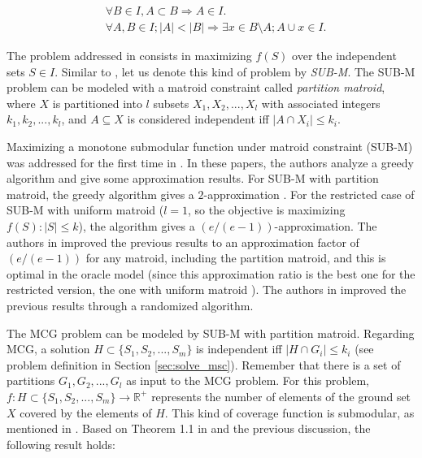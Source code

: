 \begin{align*}
&\tag{i} \forall B \in I, A \subset B \Rightarrow A \in I.\\ 
&\tag{ii} \forall A,B \in I; |A| < |B| \Rightarrow \exists x \in B \setminus A; A \cup x \in I.
\end{align*}

The problem addressed in \cite{Calinescu2011} consists in maximizing $f(S)$ over the independent sets $S \in I$. Similar to \cite{Calinescu2011}, 
let us denote this kind of problem by \emph{SUB-M}. The SUB-M problem can be modeled with a matroid constraint 
called \emph{partition matroid}, where $X$ is partitioned 
into $l$ subsets $X_1, X_2, ..., X_l$ with associated integers $k_1, k_2, ..., k_l$, 
and $A \subseteq X$ is considered independent iff $|A \cap X_i| \leq k_i$. 

Maximizing a monotone submodular function under matroid constraint (SUB-M) was addressed for the first time in \cite{Nemhauser1978,Fisher1978}. 
In these papers, the authors analyze a greedy algorithm and give some approximation results. For SUB-M with partition matroid, the greedy algorithm 
gives a $2$-approximation \cite{Fisher1978}. For the restricted case of SUB-M with uniform matroid ($l = 1$, so the objective is maximizing $f(S): |S| \le k$), the algorithm 
gives a $(e/(e-1))$-approximation. The authors in \cite{Calinescu2011} improved the previous results to an approximation factor of $(e/(e-1))$ for 
any matroid, including the partition matroid, and this is optimal in the oracle model (since this approximation ratio is the best one for the restricted version, 
the one with uniform matroid \cite{Nemhauser1978,Fisher1978}). The authors in \cite{Calinescu2011} improved the previous results through a randomized algorithm. 

The MCG problem can be modeled by SUB-M with partition matroid. Regarding MCG, a solution $H \subset \lbrace S_1, S_2, ..., S_m \rbrace$ 
is independent iff $|H \cap G_i| \leq k_i$ (see problem definition in Section \ref{sec:solve_msc}). Remember that there is a set of partitions $G_1, G_2, ..., G_l$ as input to the MCG problem. For this problem, 
$f: H \subset \lbrace S_1, S_2, ..., S_m \rbrace \rightarrow \mathbb{R}^+$ represents the number of elements of the ground set $X$ covered by 
the elements of $H$. This kind of coverage function is submodular, as mentioned in \cite{Calinescu2011}. 
Based on Theorem 1.1 in \cite{Calinescu2011} and the previous discussion, the following result holds:

